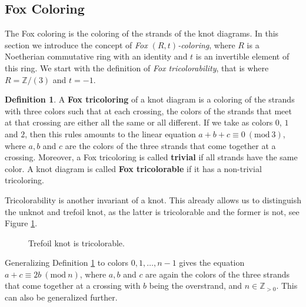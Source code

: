 \documentclass[11pt,a4paper]{article}
\theoremstyle{definition}
\newtheorem{definition}[theorem]{Definition}
\newcommand{\numberset}{\mathbb}
\newcommand{\Z}{\numberset{Z}}
\newcommand{\Mod}[1]{\ (\mathrm{mod}\ #1)}
\begin{document}
\subsection{Fox Coloring}

The Fox coloring is the coloring of the strands of the knot diagrams. In this section we introduce the concept of \textit{Fox $(R,t)$-coloring}, where $R$ is a Noetherian commutative ring with an identity and $t$ is an invertible element of this ring. 
We start with the definition of \textit{Fox tricolorability}, that is where $R=\Z/(3)$ and $t=-1$.

\begin{definition}
\label{def:3color}
A \textbf{Fox tricoloring} of a  knot diagram is a coloring of the strands with three colors such that at each crossing, the colors of the strands that meet at that crossing are either all the same or all different. If we take as colors $0$, $1$ and $2$, then this rules amounts to the linear equation $a+b+c \equiv 0 \Mod{3}$, where $a,b$ and $c$ are the colors of the three strands that come together at a crossing. Moreover, a Fox tricoloring is called \textbf{trivial} if all strands have the same color. A knot diagram is called \textbf{Fox tricolorable} if it has a non-trivial tricoloring.

\end{definition}
Tricolorability is another invariant of a knot\cite{przytycki}. This already allows us to distinguish the unknot and trefoil knot, as the latter is tricolorable and the former is not, see Figure \ref{fig:3color_trefoil}.

\begin{figure}[ht!]
    \centering
{}

    \caption{Trefoil knot is tricolorable.}
    \label{fig:3color_trefoil}
\end{figure}

Generalizing Definition \ref{def:3color} to colors $0,1, \ldots, n-1$ gives the equation $a+c \equiv 2b \Mod{n}$, where $a,b$ and $c$ are again the colors of the three strands that come together at a crossing with $b$ being the overstrand, and $n \in \Z_{>0}$. This can also be generalized further.
\end{document}
